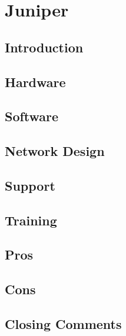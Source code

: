 \section{Juniper}

\subsection{Introduction}
\subsection{Hardware}
\subsection{Software}
\subsection{Network Design}
\subsection{Support}
\subsection{Training}
\subsection{Pros}
\subsection{Cons}
\subsection{Closing Comments}